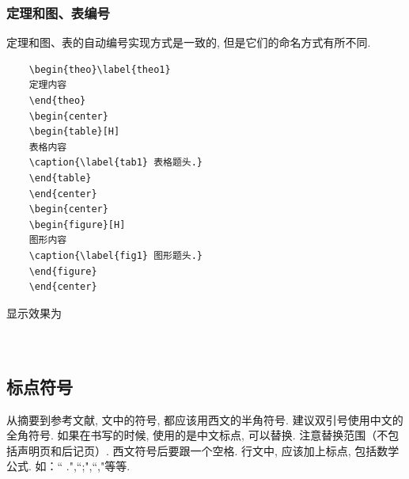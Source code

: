 \documentclass[a4paper,12pt,twoside]{ctexart}
\begin{document}
    \subsubsection{定理和图、表编号\label{subsub1}}
    定理和图、表的自动编号实现方式是一致的, 但是它们的命名方式有所不同.
    \begin{verbatim}
    \begin{theo}\label{theo1}
    定理内容
    \end{theo}
    \begin{center}
    \begin{table}[H]
    表格内容
    \caption{\label{tab1} 表格题头.}
    \end{table}
    \end{center}
    \begin{center}
    \begin{figure}[H]
    图形内容
    \caption{\label{fig1} 图形题头.}
    \end{figure}
    \end{center}
    \end{verbatim}
    \vspace*{-20pt}\noindent
    显示效果为\\
    \\[10pt]
    \\[10pt]
    \bigskip

\subsection{标点符号}
    从摘要到参考文献, 文中的符号, 都应该用西文的半角符号. 建议双引号使用中文的全角符号. 如果在书写的时候, 使用的是中文标点, 可以替换. 注意替换范围（不包括声明页和后记页）. 西文符号后要跟一个空格. 行文中, 应该加上标点, 包括数学公式. 如：`` .",``;",``,"等等.
\end{document}
